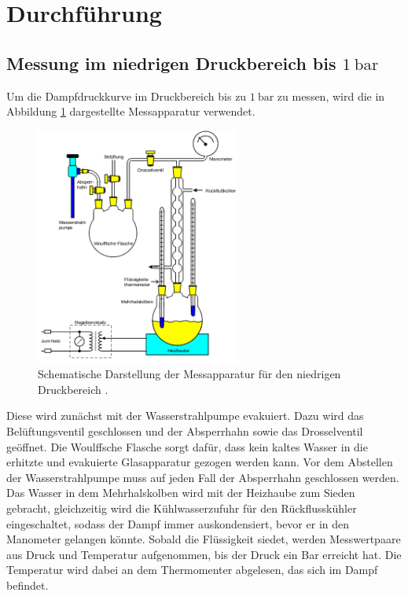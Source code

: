 \section{Durchführung}
\label{sec:Durchführung}
\subsection{Messung im niedrigen Druckbereich bis $\SI{1}{\bar}$}
Um die Dampfdruckkurve im Druckbereich bis zu $\SI{1}{\bar}$ zu messen, wird die
in Abbildung \ref{fig:messapparatur1} dargestellte Messapparatur verwendet.
\begin{figure}
  \centering
  \includegraphics[width=0.6\textwidth]{messapparatur1.png}
  \caption{Schematische Darstellung der Messapparatur für den niedrigen
  Druckbereich \cite{sample}.}
  \label{fig:messapparatur1}
\end{figure}
Diese wird zunächst mit der Wasserstrahlpumpe evakuiert. Dazu wird das
Belüftungsventil geschlossen und der Absperrhahn sowie das Drosselventil geöffnet.
Die Woulffsche Flasche sorgt dafür, dass kein kaltes Wasser in die erhitzte und
evakuierte Glasapparatur gezogen werden kann. Vor dem Abstellen der Wasserstrahlpumpe
muss auf jeden Fall der Absperrhahn geschlossen werden. Das Wasser in dem
Mehrhalskolben wird mit der Heizhaube zum Sieden gebracht, gleichzeitig wird die
Kühlwasserzufuhr für den Rückflusskühler eingeschaltet, sodass der Dampf immer
auskondensiert, bevor er in den Manometer gelangen könnte. Sobald die Flüssigkeit
siedet, werden Messwertpaare aus Druck und Temperatur aufgenommen, bis der Druck
ein Bar erreicht hat. Die Temperatur wird dabei an dem Thermomenter abgelesen,
das sich im Dampf befindet.

